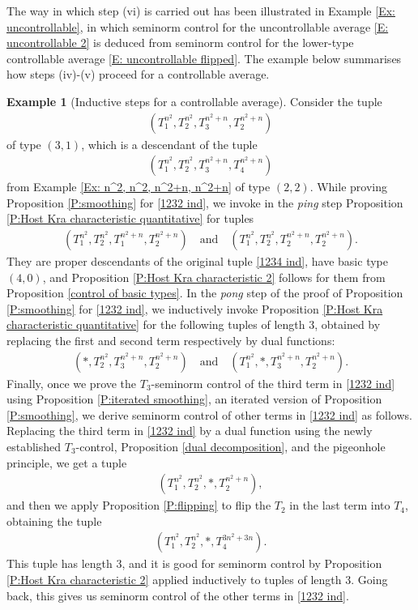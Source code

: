 \documentclass[11pt]{amsart}
\theoremstyle{definition}
\newtheorem{example}{Example}
\begin{document}
The way in which step (vi) is carried out has been illustrated in Example \ref{Ex: uncontrollable}, in which seminorm control for the uncontrollable average \eqref{E: uncontrollable 2} is deduced from seminorm control for the lower-type controllable average \eqref{E: uncontrollable flipped}. The example below summarises how steps (iv)-(v) proceed for a controllable average.

\begin{example}[Inductive steps for a controllable average]
Consider the tuple
\begin{align}\label{1232 ind}
    (T_1^{n^2}, T_2^{n^2}, T_3^{n^2+n}, T_2^{n^2 + n})
\end{align}
of type $(3, 1)$,
which is a descendant of the tuple
\begin{align}\label{1234 ind}
    (T_1^{n^2}, T_2^{n^2}, T_3^{n^2+n}, T_4^{n^2 + n})
\end{align}
from Example \ref{Ex: n^2, n^2, n^2+n, n^2+n} of type $(2,2)$.  While proving Proposition \ref{P:smoothing} for \eqref{1232 ind}, we invoke in the \textit{ping} step Proposition \ref{P:Host Kra characteristic quantitative} for tuples
\begin{align*}
    (T_1^{n^2}, T_2^{n^2}, T_1^{n^2+n}, T_2^{n^2 + n})\quad \textrm{and}\quad     (T_1^{n^2}, T_2^{n^2}, T_2^{n^2+n}, T_2^{n^2 + n}).
\end{align*}
They are proper descendants of the original tuple \eqref{1234 ind}, have basic type $(4, 0)$, and Proposition \ref{P:Host Kra characteristic 2} follows for them from Proposition \ref{control of basic types}. In the \textit{pong} step of the proof of Proposition \ref{P:smoothing} for \eqref{1232 ind}, we inductively invoke Proposition \ref{P:Host Kra characteristic quantitative} for the following tuples of length 3, obtained by replacing the first and second term respectively by dual functions:
\begin{align*}
    (*, T_2^{n^2}, T_3^{n^2+n}, T_2^{n^2 + n})\quad \textrm{and}\quad     (T_1^{n^2}, *, T_3^{n^2+n}, T_2^{n^2 + n}).
\end{align*}
Finally, once we prove the $T_3$-seminorm control of the third term in \eqref{1232 ind} using Proposition \ref{P:iterated smoothing}, an iterated version of Proposition \ref{P:smoothing}, we derive seminorm control of other terms in \eqref{1232 ind} as follows. Replacing the third term in \eqref{1232 ind} by a dual function using the newly established $T_3$-control, Proposition \ref{dual decomposition}, and the pigeonhole principle, we get a tuple
\begin{align*}
    (T_1^{n^2}, T_2^{n^2}, *, T_2^{n^2 + n}),
\end{align*}
and then we apply Proposition \ref{P:flipping} to flip the $T_2$ in the last term into $T_4$, obtaining the tuple
\begin{align*}
    (T_1^{n^2}, T_2^{n^2}, *, T_4^{3n^2 + 3n}).
\end{align*}
This tuple has length 3, and it is good for seminorm control by Proposition \ref{P:Host Kra characteristic 2} applied inductively to tuples of length 3. Going back, this gives us seminorm control of the other terms in \eqref{1232 ind}.
\end{example}
\end{document}
